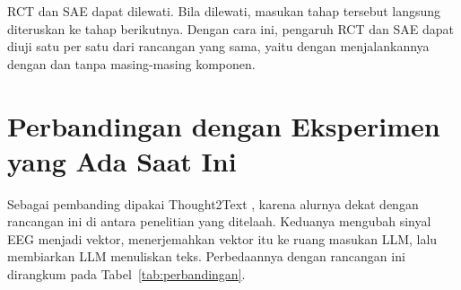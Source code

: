 RCT dan SAE dapat dilewati.
Bila dilewati, masukan tahap tersebut langsung diteruskan ke tahap berikutnya.
Dengan cara ini, pengaruh RCT dan SAE dapat diuji satu per satu dari rancangan yang sama, yaitu dengan menjalankannya dengan dan tanpa masing-masing komponen.

\section{Perbandingan dengan Eksperimen yang Ada Saat Ini}
\label{sec:perbandingan}
Sebagai pembanding dipakai Thought2Text \parencite[lihat Subbab~\ref{sec:penelitian-terkait}]{mishra2025}, karena alurnya dekat dengan rancangan ini di antara penelitian yang ditelaah.
Keduanya mengubah sinyal EEG menjadi vektor, menerjemahkan vektor itu ke ruang masukan LLM, lalu membiarkan LLM menuliskan teks.
Perbedaannya dengan rancangan ini dirangkum pada Tabel~\ref{tab:perbandingan}.

